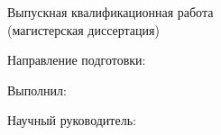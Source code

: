 \thispagestyle{empty}

\begin{center}
\thesisOrganization \par
\par
\end{center}

\vspace{5mm}

\begin{center}
{\bf \large \thesisTitle
\par}

\vspace{5mm}
Выпускная квалификационная работа \\
(магистерская диссертация)

\vspace{5mm}
{%
Направление подготовки: \thesisSpecialtyNumber \thesisSpecialtyTitle
}

\end{center}

\vspace{13mm}
\begin{flushleft}
	Выполнил:
	
	\thesisAuthorRegalia \thesisAuthor
\end{flushleft}

\vspace{10mm}
\begin{flushleft}
Научный руководитель:

\supervisorRegalia \supervisorFio
\end{flushleft} 

\begin{center}
{\thesisCity \thesisYear}
\end{center}

\newpage
